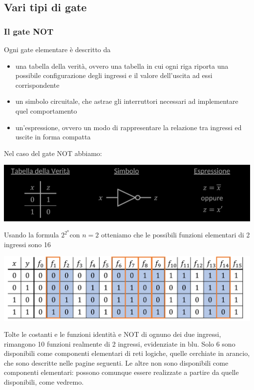 \documentclass{article}
\begin{document}
\subsection{Vari tipi di gate}
\subsubsection{Il gate NOT}
Ogni gate elementare è descritto da
\begin{itemize}
    \item una tabella della verità, ovvero una tabella in cui ogni riga riporta una possibile configurazione degli ingressi e il valore dell’uscita ad essi corrispondente
    \item un simbolo circuitale, che astrae gli interruttori necessari ad implementare quel comportamento
    \item un’espressione, ovvero un modo di rappresentare la relazione tra ingressi ed uscite in forma compatta
\end{itemize}
Nel caso del gate NOT abbiamo:
\begin{center}
    \includegraphics[scale=0.35]{desgate.png}
\end{center}
Usando la formula $2^{2^n}$con $n=2$ otteniamo che le possibili funzioni elementari di 2 ingressi sono 16
\begin{center}
    \includegraphics[scale=0.35]{funzioni2.png}
\end{center}
Tolte le costanti e le funzioni identità e NOT di ognuno dei due ingressi, rimangono 10 funzioni realmente di 2 ingressi, evidenziate in blu. Solo 6 sono disponibili come componenti elementari di reti logiche, quelle cerchiate in arancio, che sono descritte nelle pagine seguenti. Le altre non sono disponibili come componenti elementari: possono comunque essere realizzate a partire da quelle disponibili, come vedremo.
\end{document}
